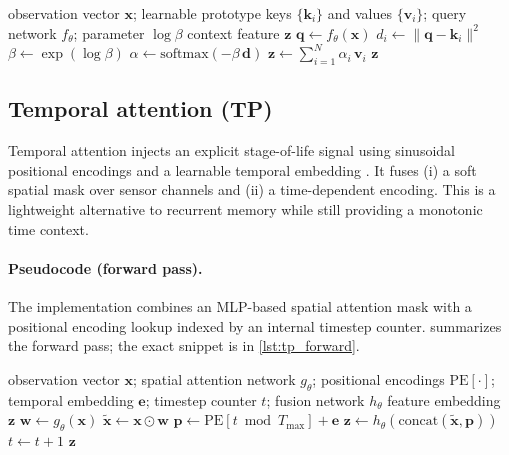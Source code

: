 \documentclass[11pt]{article}
\begin{document}
\begin{algorithm}[t]
\caption{NW attention feature extractor (forward pass)}
\label{alg:nw_forward}
\begin{algorithmic}[1]
\Require observation vector $\mathbf{x}$; learnable prototype keys $\{\mathbf{k}_i\}$ and values $\{\mathbf{v}_i\}$; query network $f_\theta$; parameter $\log\beta$
\Ensure context feature $\mathbf{z}$
\State $\mathbf{q} \gets f_\theta(\mathbf{x})$ 
	\State $d_i \gets \lVert \mathbf{q}-\mathbf{k}_i\rVert^2$
\EndFor
\State $\beta \gets \exp(\log\beta)$ 
\State $\alpha \gets \mathrm{softmax}(-\beta\,\mathbf{d})$ 
\State $\mathbf{z} \gets \sum_{i=1}^{N} \alpha_i\,\mathbf{v}_i$
\State \Return $\mathbf{z}$
\end{algorithmic}
\end{algorithm}

\subsection{Temporal attention (TP)}
Temporal attention injects an explicit stage-of-life signal using sinusoidal positional encodings and a learnable temporal embedding \parencite{Vaswani2017Attention}. It fuses (i) a soft spatial mask over sensor channels and (ii) a time-dependent encoding. This is a lightweight alternative to recurrent memory while still providing a monotonic time context.

\paragraph{Pseudocode (forward pass).}
The implementation combines an MLP-based spatial attention mask with a positional encoding lookup indexed by an internal timestep counter.  summarizes the forward pass; the exact snippet is in \cref{lst:tp_forward}.

\begin{algorithm}[t]
\caption{Temporal attention feature extractor (forward pass)}
\label{alg:tp_forward}
\begin{algorithmic}[1]
\Require observation vector $\mathbf{x}$; spatial attention network $g_\theta$; positional encodings $\mathrm{PE}[\cdot]$; temporal embedding $\mathbf{e}$; timestep counter $t$; fusion network $h_\theta$
\Ensure feature embedding $\mathbf{z}$
\State $\mathbf{w} \gets g_\theta(\mathbf{x})$ 
\State $\tilde{\mathbf{x}} \gets \mathbf{x} \odot \mathbf{w}$
\State $\mathbf{p} \gets \mathrm{PE}[t \bmod T_{\max}] + \mathbf{e}$
\State $\mathbf{z} \gets h_\theta(\mathrm{concat}(\tilde{\mathbf{x}},\mathbf{p}))$
\State $t \gets t+1$
\State \Return $\mathbf{z}$
\end{algorithmic}
\end{algorithm}
\end{document}
